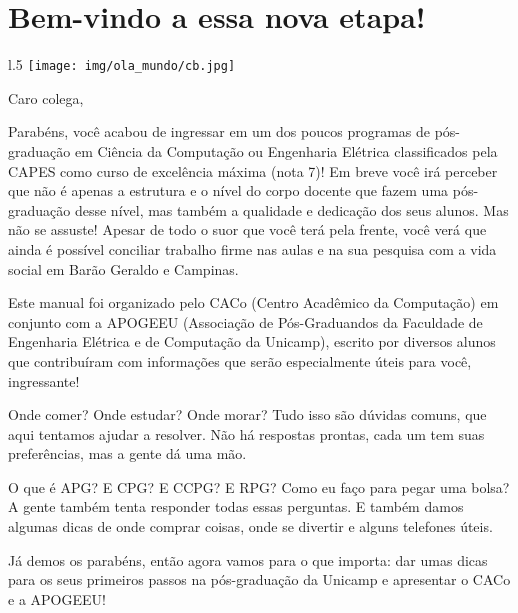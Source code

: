 
\section{Bem-vindo a essa nova etapa!}

\begin{wrapfigure}{l}{.5\textwidth}
    \texttt{[image: img/ola\_mundo/cb.jpg]}
\end{wrapfigure}

Caro colega,

Parabéns, você acabou de ingressar em um dos poucos programas de pós-graduação em Ciência da Computação ou Engenharia Elétrica classificados pela CAPES como curso de excelência máxima (nota 7)! Em breve você irá perceber que não é apenas a estrutura e o nível do corpo docente que fazem uma pós-graduação desse nível, mas também a qualidade e dedicação dos seus alunos. Mas não se assuste! Apesar de todo o suor que você terá pela frente, você verá que ainda é possível conciliar trabalho firme nas aulas e na sua pesquisa com a vida social em Barão Geraldo e Campinas.

Este manual foi organizado pelo CACo (Centro Acadêmico da Computação) em conjunto com a APOGEEU (Associação de Pós-Graduandos da Faculdade de Engenharia Elétrica e de Computação da Unicamp), escrito por diversos alunos que contribuíram com informações que serão especialmente úteis para você, ingressante!

Onde comer? Onde estudar? Onde morar? Tudo isso são dúvidas comuns, que aqui tentamos ajudar a resolver. Não há respostas prontas, cada um tem suas preferências, mas a gente dá uma mão.

O que é APG? E CPG? E CCPG? E RPG? Como eu faço para pegar uma bolsa? A gente também tenta responder todas essas perguntas. E também damos algumas dicas de onde comprar coisas, onde se divertir e alguns telefones úteis.

Já demos os parabéns, então agora vamos para o que importa: dar umas dicas para os seus primeiros passos na pós-graduação da Unicamp e apresentar o CACo e a APOGEEU!